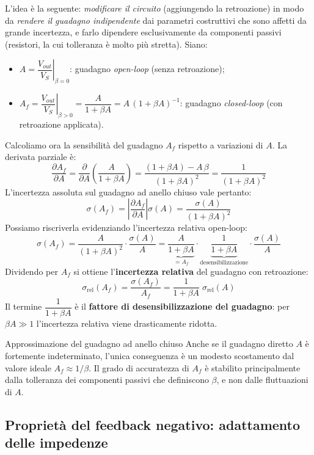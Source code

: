 \medskip
\noindent
L'idea è la seguente: \emph{modificare il circuito} (aggiungendo la retroazione) in modo da \emph{rendere il guadagno indipendente} dai parametri costruttivi che sono affetti da grande incertezza, e farlo dipendere esclusivamente da componenti passivi (resistori, la cui tolleranza è molto più stretta). Siano:
\begin{itemize}[noitemsep, leftmargin=*]
    \item $A = \left.\dfrac{V_{out}}{V_S}\right|_{\beta=0}$: guadagno \textit{open-loop} (senza retroazione);
    \item $A_f = \left.\dfrac{V_{out}}{V_S}\right|_{\beta>0} = \dfrac{A}{1 + \beta A} = A\,(1 + \beta A)^{-1}$: guadagno \textit{closed-loop} (con retroazione applicata).
\end{itemize}

\noindent
Calcoliamo ora la sensibilità del guadagno $A_f$ rispetto a variazioni di $A$. La derivata parziale è:
\[
    \frac{\partial A_f}{\partial A} = \frac{\partial}{\partial A}\!\left(\frac{A}{1 + \beta A}\right) = \frac{(1+\beta A) - A\,\beta}{(1+\beta A)^2} = \frac{1}{(1 + \beta A)^2}
\]
L'incertezza assoluta sul guadagno ad anello chiuso vale pertanto:
\[
    \sigma(A_f) = \left|\frac{\partial A_f}{\partial A}\right| \sigma(A) = \frac{\sigma(A)}{(1 + \beta A)^2}
\]
Possiamo riscriverla evidenziando l'incertezza relativa open-loop:
\[
    \sigma(A_f) = \frac{A}{(1 + \beta A)^2} \cdot \frac{\sigma(A)}{A}
    = \underbrace{\frac{A}{1 + \beta A}}_{= A_f} \cdot \underbrace{\frac{1}{1 + \beta A}}_{\text{desensibilizzazione}} \cdot \frac{\sigma(A)}{A}
\]
Dividendo per $A_f$ si ottiene l'\textbf{incertezza relativa} del guadagno con retroazione:
\[
    \boxed{\;\sigma_{\mathrm{rel}}(A_f) = \frac{\sigma(A_f)}{A_f} = \frac{1}{1 + \beta A}\;\sigma_{\mathrm{rel}}(A)\;}
\]
Il termine $\dfrac{1}{1 + \beta A}$ è il \textbf{fattore di desensibilizzazione del guadagno}: per $\beta A \gg 1$ l'incertezza relativa viene drasticamente ridotta.

\medskip
\begin{osservazione}{Approssimazione del guadagno ad anello chiuso}
    Anche se il guadagno diretto $A$ è fortemente indeterminato, l'unica conseguenza è un modesto scostamento dal valore ideale $A_f \approx 1/\beta$. Il grado di accuratezza di $A_f$ è stabilito principalmente dalla tolleranza dei componenti passivi che definiscono $\beta$, e non dalle fluttuazioni di $A$.
\end{osservazione}

\subsection*{Proprietà del feedback negativo: adattamento delle impedenze}

